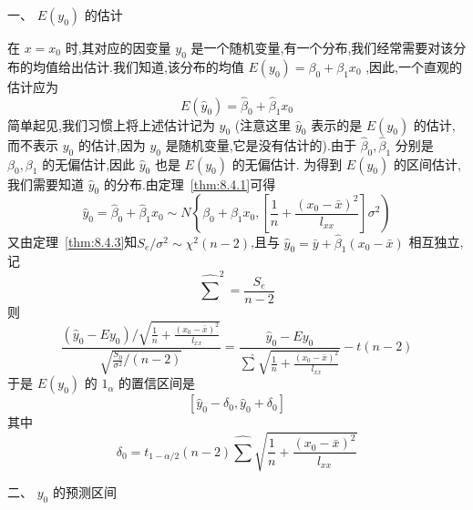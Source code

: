 一、 $E(y_0)$ 的估计

在 $x=x_0$ 时,其对应的因变量 $y_0$ 是一个随机变量,有一个分布,我们经常需要对该分布的均值给出估计.我们知道,该分布的均值 $E(y_0)=\beta_0+\beta_1x_0$ ,因此,一个直观的估计应为
\begin{equation}
E(\widehat{y}_0)=\widehat{\beta }_0+\widehat{\beta }_1x_0
\end{equation}
简单起见,我们习惯上将上述估计记为 $\hat{y}_0$ (注意这里 $\hat{y}_0$ 表示的是 $E(y_0)$ 的估计,而不表示 $y_0$ 的估计,因为 $y_0$ 是随机变量,它是没有估计的).由于 $\hat{\beta}_0,\hat{\beta}_1$ 分别是 $\beta_0,\beta_1$ 的无偏估计,因此 $\hat{y}_0$ 也是 $E(y_0)$ 的无偏估计.
为得到 $E(y_0)$ 的区间估计,我们需要知道 $\hat{y}_0$ 的分布.由定理~\ref{thm:8.4.1}可得
\begin{equation}
\hat{y}_{0}=\hat{\beta}_{0}+\hat{\beta}_{1} x_{0} \sim N\left\{\beta_{0}+\beta_{1} x_{0},\left[\frac{1}{n}+\frac{\left(x_{0}-\bar{x}\right)^{2}}{l_{x x}}\right] \sigma^{2}\right)
\end{equation}
又由定理~\ref{thm:8.4.3}知$S_{e} / \sigma^{2} \sim \chi^{2}(n-2)$,且与 $\hat{y}_{0}=\bar{y}+\hat{\beta}_{1}\left(x_{0}-\bar{x}\right)$ 相互独立,记
\begin{equation}
\hat{\sum}^2=\frac{S_e}{n-2}  
\end{equation}
则
\begin{equation}
\frac{\left(\hat{y}_{0}-E y_{0}\right) / \sqrt{\frac{1}{n}+\frac{\left(x_{0}-\bar{x}\right)^{2}}{l_{x x}}}}{\sqrt{\frac{S_{0}}{\sigma^{2}} /(n-2)}}=\frac{\hat{y}_{0}-E y_{0}}{\hat{\sum} \sqrt{\frac{1}{n}+\frac{\left(x_{0}-\bar{x}\right)^{2}}{l_{x x}}}}-t(n-2)
\end{equation}
于是 $E(y_0)$ 的 $1_\alpha$ 的置信区间是
\begin{equation}
\left[ \widehat{y}_0-\delta _0,\widehat{y}_0+\delta _0 \right] \label{eq:8.4.20}
\end{equation}
其中
\begin{equation}
\delta_{0}=t_{1-\alpha / 2}(n-2) \hat{\sum} \sqrt{\frac{1}{n}+\frac{\left(x_{0}-\bar{x}\right)^{2}}{l_{x x}}}\label{eq:8.4.21}
\end{equation}

二、 $y_0$ 的预测区间

